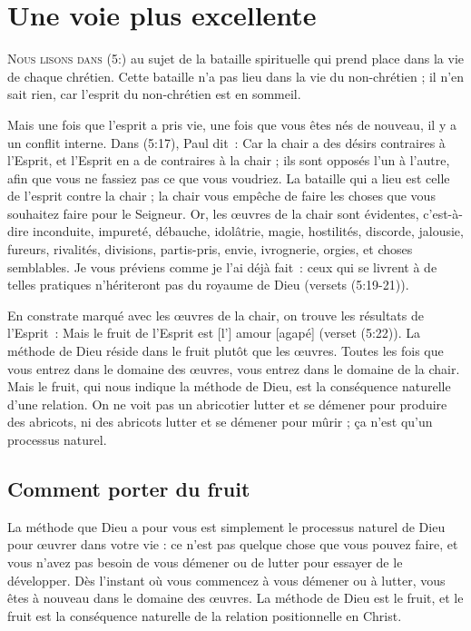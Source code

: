 \chapter{Une voie plus excellente}

\lettrine{N}{ous lisons dans (5:)}
 au sujet de la bataille spirituelle
 qui prend place dans la vie de chaque chrétien.
 Cette bataille n'a pas lieu dans la vie du non-chrétien ;
 il n'en sait rien, car l'esprit du non-chrétien est en sommeil.

Mais une fois que l'esprit a pris vie, une fois que vous êtes nés de nouveau,
 il y a un conflit interne. Dans (5:17), Paul dit~:
 \og Car la chair a des désirs contraires à l'Esprit,
 et l'Esprit en a de contraires à la chair ; ils sont opposés l'un à l'autre,
 afin que vous ne fassiez pas ce que vous voudriez. \fg{}
 La bataille qui a lieu est celle de l'esprit contre la chair ;
 la chair vous empêche de faire les choses que vous souhaitez
 faire pour le Seigneur.
 \og Or, les œuvres de la chair sont évidentes, c'est-à-dire inconduite,
 impureté, débauche, idolâtrie, magie, hostilités, discorde, jalousie,
 fureurs, rivalités, divisions, partis-pris, envie, ivrognerie, orgies,
 et choses semblables. Je vous préviens comme je l'ai déjà fait~:
 ceux qui se livrent à de telles pratiques n'hériteront pas
 du royaume de Dieu \fg{} (versets (5:19-21)).

En constrate marqué avec les œuvres de la chair, on trouve les résultats
 de l'Esprit~: \og Mais le fruit de l'Esprit est [l'] amour [agapé] \fg{}
 (verset (5:22)). La méthode de Dieu réside dans le fruit
 plutôt que les œuvres. Toutes les fois que vous entrez dans le domaine
 des œuvres, vous entrez dans le domaine de la chair.
 Mais le fruit, qui nous indique la méthode de Dieu, est la conséquence
 naturelle d'une relation. On ne voit pas un abricotier lutter
 et se démener pour produire des abricots, ni des abricots lutter
 et se démener pour mûrir ; ça n'est qu'un processus naturel.


\section*{Comment porter du fruit}

La méthode que Dieu a pour vous est simplement le processus naturel
 de Dieu pour œuvrer dans votre vie : ce n'est pas quelque chose
 que vous pouvez faire, et vous n'avez pas besoin de vous démener
 ou de lutter pour essayer de le développer.
 Dès l'instant où vous commencez à vous démener ou à lutter,
 vous êtes à nouveau dans le domaine des œuvres.
 La méthode de Dieu est le fruit, et le fruit est la conséquence
 naturelle de la relation positionnelle en Christ.

